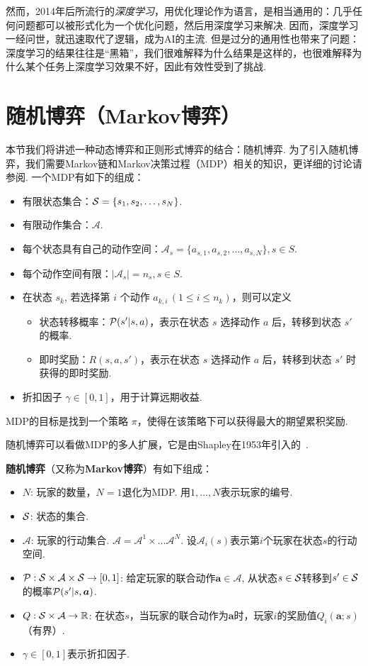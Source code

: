 然而，2014年后所流行的\textit{深度学习}，用优化理论作为语言，是相当通用的：几乎任何问题都可以被形式化为一个优化问题，然后用深度学习来解决. 因而，深度学习一经问世，就迅速取代了逻辑，成为AI的主流. 但是过分的通用性也带来了问题：深度学习的结果往往是“黑箱”，我们很难解释为什么结果是这样的，也很难解释为什么某个任务上深度学习效果不好，因此有效性受到了挑战.

\section{随机博弈（Markov博弈）}\label{sec:stochastic-game}

本节我们将讲述一种动态博弈和正则形式博弈的结合：随机博弈. 为了引入随机博弈，我们需要Markov链和Markov决策过程（MDP）相关的知识，更详细的讨论请参阅. 一个MDP有如下的组成：
\begin{itemize}
\item 有限状态集合：$\mathcal S=\{s_1,s_2,\dots,s_N\}$.
\item 有限动作集合：$\mathcal A$.
\item 每个状态具有自己的动作空间：$\mathcal A_s = \{a_{s,1},a_{s,2},\dots, a_{s,N}\}, s\in S$.
\item 每个动作空间有限：$|\mathcal A_s|=n_s, s\in S$.
\item 在状态 $s_k$, 若选择第 $i$ 个动作 $a_{k,i}\,(1\leq i\leq n_{k})$，则可以定义
\begin{itemize}
        \item 状态转移概率：$\mathcal P(s'|s,a)$，表示在状态 $s$ 选择动作 $a$ 后，转移到状态 $s'$ 的概率. 
        \item 即时奖励：$R(s,a,s')$，表示在状态 $s$ 选择动作 $a$ 后，转移到状态 $s'$ 时获得的即时奖励. 
   \end{itemize}
\item 折扣因子 $\gamma\in[0,1]$，用于计算远期收益.
\end{itemize}
MDP的目标是找到一个策略 $\pi$，使得在该策略下可以获得最大的期望累积奖励. 

随机博弈可以看做MDP的多人扩展，它是由Shapley在1953年引入的~\cite{shapleyStochasticGames1953}.

\begin{definition}
\textbf{随机博弈}（又称为\textbf{Markov博弈}）有如下组成：
\begin{itemize}
\item $N$: 玩家的数量，$N=1$退化为MDP. 用$1,\dots,N$表示玩家的编号.
\item $\mathcal S$: 状态的集合.
\item $\mathcal A$: 玩家的行动集合. $\mathcal A=\mathcal A^1\times \dots\mathcal A^N$. 设$\mathcal A_i(s)$表示第$i$个玩家在状态$s$的行动空间.
\item $\mathcal P: \mathcal S\times \mathcal A\times \mathcal S\to [0,1]$: 给定玩家的联合动作$\boldsymbol a\in\mathcal A$, 从状态$s\in \mathcal S$转移到$s'\in \mathcal S$的概率$\mathcal P(s'|s,\boldsymbol a)$.
\item $Q: \mathcal S\times \mathcal A\to \mathbb{R}$: 在状态$s$，当玩家的联合动作为$\boldsymbol a$时，玩家$i$的奖励值$Q_i(\boldsymbol a;s)$（有界）.
\item $\gamma\in[0,1]$表示折扣因子.
\end{itemize}
\end{definition}

